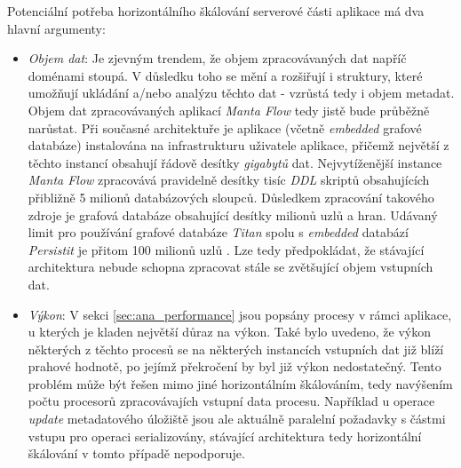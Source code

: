 Potenciální potřeba horizontálního škálování serverové části aplikace má dva hlavní argumenty:

\begin{itemize}
	\item{\textit{Objem dat}}: Je zjevným trendem, že objem zpracovávaných dat napříč doménami stoupá. V důsledku toho se mění a rozšiřují i struktury, které umožňují ukládání a/nebo analýzu těchto dat - vzrůstá tedy i objem metadat. Objem dat zpracovávaných aplikací \textit{Manta Flow} tedy jistě bude průběžně narůstat. Při současné architektuře je aplikace (včetně \textit{embedded} grafové databáze) instalována na infrastrukturu uživatele aplikace, přičemž největší z těchto instancí obsahují řádově desítky \textit{gigabytů} dat. Nejvytíženější instance \textit{Manta Flow} zpracovává pravidelně desítky tisíc \textit{DDL} skriptů obsahujících přibližně 5 milionů databázových sloupců. Důsledkem zpracování takového zdroje je grafová databáze obsahující desítky milionů uzlů a hran. Udávaný limit pro používání grafové databáze \textit{Titan} spolu s \textit{embedded} databází \textit{Persistit} je přitom 100 milionů uzlů \cite{TitanPersistit04}. Lze tedy předpokládat, že stávající architektura nebude schopna zpracovat stále se zvětšující objem vstupních dat.

	\item{\textit{Výkon}}: V sekci \ref{sec:ana_performance} jsou popsány procesy v rámci aplikace, u kterých je kladen největší důraz na výkon. Také bylo uvedeno, že výkon některých z těchto procesů se na některých instancích vstupních dat již blíží prahové hodnotě, po jejímž překročení by byl již výkon nedostatečný. Tento problém může být řešen mimo jiné horizontálním škálováním, tedy navýšením počtu procesorů zpracovávajích vstupní data procesu. Například u operace \textit{update} metadatového úložiště jsou ale aktuálně paralelní požadavky s částmi vstupu pro operaci serializovány, stávající architektura tedy horizontální škálování v tomto případě nepodporuje.
\end{itemize}


